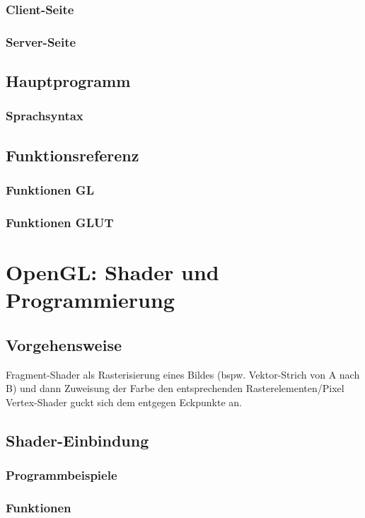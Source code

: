 \subsection{Client-Seite}
\subsection{Server-Seite}

\section{Hauptprogramm}
\subsection{Sprachsyntax}

\section{Funktionsreferenz}
\subsection{Funktionen GL}
\subsection{Funktionen GLUT}

\chapter{OpenGL: Shader und Programmierung}
\section{Vorgehensweise}
Fragment-Shader als Rasterisierung eines Bildes (bspw. Vektor-Strich von A nach B) und dann Zuweisung der Farbe den entsprechenden Rasterelementen/Pixel\\
Vertex-Shader guckt sich dem entgegen Eckpunkte an.
\section{Shader-Einbindung}
\subsection{Programmbeispiele}
\subsection{Funktionen}

